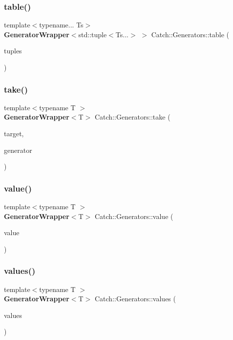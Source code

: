 \mbox{\label{namespace_catch_1_1_generators_a6e0436ad4eddeabdc34281119201dbfe}} 
\subsubsection{table()}
{\footnotesize\ttfamily template$<$typename... Ts$>$ \\
\textbf{ Generator\+Wrapper}$<$std\+::tuple$<$Ts...$>$ $>$ Catch\+::\+Generators\+::table (\begin{DoxyParamCaption}\item[{std\+::initializer\+\_\+list$<$ std\+::tuple$<$ typename std\+::decay$<$ Ts $>$\+::type... $>$$>$}]{tuples }\end{DoxyParamCaption})}

\mbox{\label{namespace_catch_1_1_generators_a972480864d60131946f6f53c566de070}} 
\subsubsection{take()}
{\footnotesize\ttfamily template$<$typename T $>$ \\
\textbf{ Generator\+Wrapper}$<$T$>$ Catch\+::\+Generators\+::take (\begin{DoxyParamCaption}\item[{size\+\_\+t}]{target,  }\item[{\textbf{ Generator\+Wrapper}$<$ T $>$ \&\&}]{generator }\end{DoxyParamCaption})}

\mbox{\label{namespace_catch_1_1_generators_a3c4989dd0dca44455f55484cedaa18da}} 
\subsubsection{value()}
{\footnotesize\ttfamily template$<$typename T $>$ \\
\textbf{ Generator\+Wrapper}$<$T$>$ Catch\+::\+Generators\+::value (\begin{DoxyParamCaption}\item[{T \&\&}]{value }\end{DoxyParamCaption})}

\mbox{\label{namespace_catch_1_1_generators_a55ca9a1132e662d9603c516161dcae35}} 
\subsubsection{values()}
{\footnotesize\ttfamily template$<$typename T $>$ \\
\textbf{ Generator\+Wrapper}$<$T$>$ Catch\+::\+Generators\+::values (\begin{DoxyParamCaption}\item[{std\+::initializer\+\_\+list$<$ T $>$}]{values }\end{DoxyParamCaption})}

